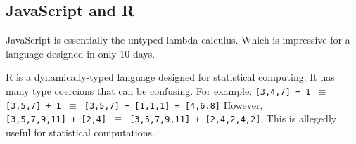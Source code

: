 \documentclass[twoside]{article}
\begin{document}
\subsection{JavaScript and R}
JavaScript is essentially the untyped lambda calculus. Which is impressive for a
language designed in only 10 days.

R is a dynamically-typed language designed for statistical computing. It has
many type coercions that can be confusing. For example:
\texttt{[3,4,7]~+~1 $\equiv$ [3,5,7]~+~1 $\equiv$ [3,5,7]~+~[1,1,1] = [4,6.8]}
However, \texttt{[3,5,7,9,11]~+~[2,4] $\equiv$ [3,5,7,9,11]~+~[2,4,2,4,2]}. This
is allegedly useful for statistical computations.
\end{document}
